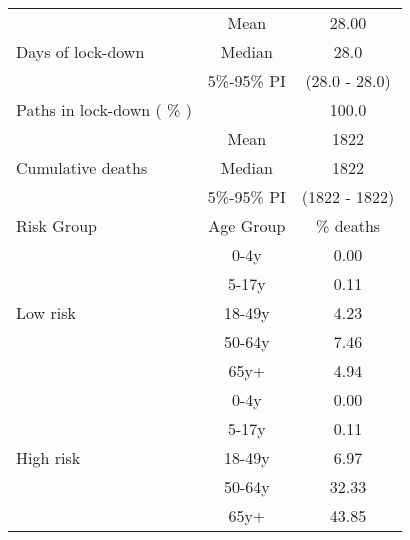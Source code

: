 \documentclass{article}
\begin{document}
\begin{table}[th]
\centering
\begin{tabular}{p{4cm}cc}
\toprule
\multirow{3}{*}{Days   of lock-down} & Mean      & 28.00                        \\ \cmidrule(l){2-3} 
                                     & Median    & 28.0                      \\ \cmidrule(l){2-3} 
                                     & 5\%-95\% PI & (28.0 - 28.0)       \\ \midrule 
\multirow{1}{*}{Paths in lock-down ( \% )} &      &         100.0              \\   \midrule                     
\multirow{3}{\hsize}{Cumulative deaths}       & Mean      & 1822 \\ \cmidrule(l){2-3} 
                                     & Median    & 1822                        \\ \cmidrule(l){2-3} 
                                     & 5\%-95\% PI & (1822 - 1822)           \\  \midrule
Risk Group                           & Age Group & \multicolumn{1}{c}{\% deaths}        \\  \midrule
\multirow{5}{*}{Low   risk}          & 0-4y      & 0.00                         \\ \cmidrule(l){2-3} 
                                     & 5-17y     & 0.11                         \\ \cmidrule(l){2-3} 
                                     & 18-49y    & 4.23                         \\ \cmidrule(l){2-3} 
                                     & 50-64y    & 7.46                         \\ \cmidrule(l){2-3} 
                                     & 65y+      & 4.94                         \\ \midrule
\multirow{5}{*}{High   risk}         & 0-4y      & 0.00                         \\ \cmidrule(l){2-3} 
                                     & 5-17y     & 0.11                         \\ \cmidrule(l){2-3} 
                                     & 18-49y    & 6.97                         \\ \cmidrule(l){2-3} 
                                     & 50-64y    & 32.33                         \\ \cmidrule(l){2-3} 
                                     & 65y+      & 43.85                         \\ \midrule

\end{tabular}
\end{table}
\end{document}
